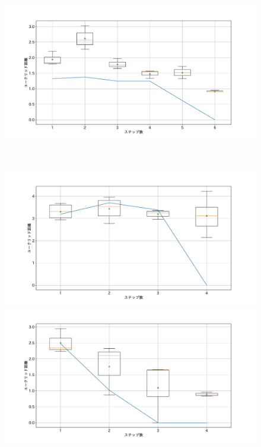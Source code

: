 \begin{figure}[h]
\begin{minipage}[b]{0.48\linewidth}
 \end{minipage}
 \begin{minipage}[b]{0.48\linewidth}
  \centering
  \includegraphics[scale=0.15]{./imgs/gaChange/sofa2_6.pdf}
 \end{minipage}\\
 \begin{minipage}[b]{0.48\linewidth}
  \centering
  \includegraphics[scale=0.15]{./imgs/gaChange/sofa1_7.pdf}
 \end{minipage}
 \begin{minipage}[b]{0.48\linewidth}
  \centering
  \includegraphics[scale=0.15]{./imgs/gaChange/sofa2_7.pdf}

\end{minipage}
\end{figure}
